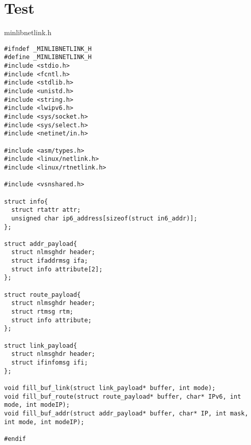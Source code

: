 \chapter{Test}             %
\label{code:AppC}

minlibnetlink.h
\begin{lstlisting}[style=CscriptStyle]
#ifndef _MINLIBNETLINK_H
#define _MINLIBNETLINK_H
#include <stdio.h>
#include <fcntl.h>
#include <stdlib.h>
#include <unistd.h>
#include <string.h>
#include <lwipv6.h>
#include <sys/socket.h>
#include <sys/select.h>
#include <netinet/in.h>

#include <asm/types.h>
#include <linux/netlink.h>
#include <linux/rtnetlink.h>

#include <vsnshared.h>

struct info{
  struct rtattr attr;
  unsigned char ip6_address[sizeof(struct in6_addr)];
};

struct addr_payload{
  struct nlmsghdr header;
  struct ifaddrmsg ifa;
  struct info attribute[2];
};

struct route_payload{
  struct nlmsghdr header;
  struct rtmsg rtm;
  struct info attribute;
};

struct link_payload{
  struct nlmsghdr header;
  struct ifinfomsg ifi;
};

void fill_buf_link(struct link_payload* buffer, int mode);
void fill_buf_route(struct route_payload* buffer, char* IPv6, int mode, int modeIP);
void fill_buf_addr(struct addr_payload* buffer, char* IP, int mask, int mode, int modeIP);

#endif
\end{lstlisting}

